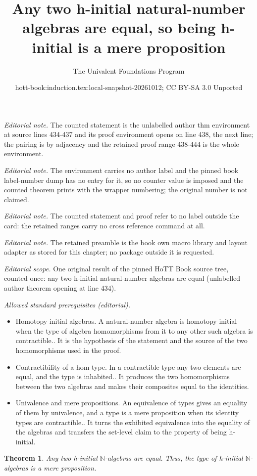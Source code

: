 \documentclass[10pt,a4paper]{article}
\title{Any two h-initial natural-number algebras are equal, so being h-initial is a mere proposition}
\author{The Univalent Foundations Program}
\date{hott-book:induction.tex:local-snapshot-20261012; CC BY-SA 3.0 Unported}
\newcounter{chapter}
\newcommand{\N}{\ensuremath{\mathbb{N}}\xspace}
\let\nat\N
\newtheorem{thm}{Theorem}[section]
\theoremstyle{definition}
\theoremstyle{remark}
\numberwithin{equation}{section}
\begin{document}
\maketitle
\noindent\textit{Editorial note.} The counted statement is the unlabelled author thm environment at source lines 434-437 and its proof environment opens on line 438, the next line; the pairing is by adjacency and the retained proof range 438-444 is the whole environment.\par\medskip
\noindent\textit{Editorial note.} The environment carries no author label and the pinned book label-number dump has no entry for it, so no counter value is imposed and the counted theorem prints with the wrapper numbering; the original number is not claimed.\par\medskip
\noindent\textit{Editorial note.} The counted statement and proof refer to no label outside the card: the retained ranges carry no cross reference command at all.\par\medskip
\noindent\textit{Editorial note.} The retained preamble is the book own macro library and layout adapter as stored for this chapter; no package outside it is requested.\par\medskip
\noindent\textit{Editorial scope.} One original result of the pinned HoTT Book source tree, counted once: any two h-initial natural-number algebras are equal (unlabelled author theorem opening at line 434).\par\medskip
\noindent\textit{Allowed standard prerequisites (editorial).}\begin{itemize}
\item Homotopy initial algebras. A natural-number algebra is homotopy initial when the type of algebra homomorphisms from it to any other such algebra is contractible.. It is the hypothesis of the statement and the source of the two homomorphisms used in the proof.
\item Contractibility of a hom-type. In a contractible type any two elements are equal, and the type is inhabited.. It produces the two homomorphisms between the two algebras and makes their composites equal to the identities.
\item Univalence and mere propositions. An equivalence of types gives an equality of them by univalence, and a type is a mere proposition when its identity types are contractible.. It turns the exhibited equivalence into the equality of the algebras and transfers the set-level claim to the property of being h-initial.
\end{itemize}\medskip
\begin{thm}
  Any two h-initial $\nat$-algebras are equal.
  Thus, the type of h-initial $\nat$-algebras is a mere proposition.
\end{thm}
\end{document}
